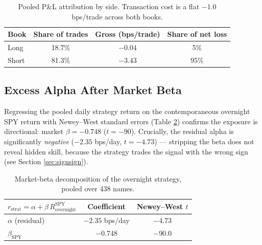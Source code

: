 \documentclass[11pt]{article}
\begin{document}
\begin{table}[htbp]
\centering
\begin{tabular}{lccc}
\toprule
\textbf{Book} & \textbf{Share of trades} & \textbf{Gross (bps/trade)} & \textbf{Share of net loss} \\
\midrule
Long  & 18.7\% & $-0.04$ & 5\% \\
Short & 81.3\% & $-3.43$ & 95\% \\
\bottomrule
\end{tabular}
\caption{Pooled P\&L attribution by side. Transaction cost is a flat $-1.0$ bps/trade across both books.}
\label{tab:pnl_attrib}
\end{table}

\subsection{Excess Alpha After Market Beta}
Regressing the pooled daily strategy return on the contemporaneous overnight SPY return with Newey--West standard errors (Table \ref{tab:m5}) confirms the exposure is directional: market $\beta = -0.748$ ($t=-90$). Crucially, the residual alpha is significantly \emph{negative} ($-2.35$ bps/day, $t=-4.73$) --- stripping the beta does not reveal hidden skill, because the strategy trades the signal with the wrong sign (see Section \ref{sec:signsign}).

\begin{table}[htbp]
\centering
\begin{tabular}{lcc}
\toprule
\textbf{$r_{\text{strat}} = \alpha + \beta\, R^{\text{SPY}}_{\text{overnight}}$} & \textbf{Coefficient} & \textbf{Newey--West $t$} \\
\midrule
$\alpha$ (residual) & $-2.35$ bps/day & $-4.73$ \\
$\beta_{\text{SPY}}$ & $-0.748$ & $-90.0$ \\
\bottomrule
\end{tabular}
\caption{Market-beta decomposition of the overnight strategy, pooled over 438 names.}
\label{tab:m5}
\end{table}
\end{document}
